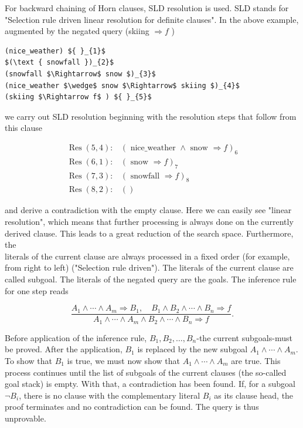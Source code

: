 \documentclass[10pt]{article}
\begin{document}
For backward chaining of Horn clauses, SLD resolution is used. SLD stands for "Selection rule driven linear resolution for definite clauses". In the above example, augmented by the negated query (skiing $\Rightarrow f$ )

\begin{verbatim}
(nice_weather) ${ }_{1}$
$(\text { snowfall })_{2}$
(snowfall $\Rightarrow$ snow $)_{3}$
(nice_weather $\wedge$ snow $\Rightarrow$ skiing $)_{4}$
(skiing $\Rightarrow f$ ) ${ }_{5}$
\end{verbatim}

we carry out SLD resolution beginning with the resolution steps that follow from this clause

$$
\begin{array}{ll}
\operatorname{Res}(5,4): & (\text { nice_weather } \wedge \text { snow } \Rightarrow f)_{6} \\
\operatorname{Res}(6,1): & (\text { snow } \Rightarrow f)_{7} \\
\operatorname{Res}(7,3): & (\text { snowfall } \Rightarrow f)_{8} \\
\operatorname{Res}(8,2): & ()
\end{array}
$$

and derive a contradiction with the empty clause. Here we can easily see "linear resolution", which means that further processing is always done on the currently derived clause. This leads to a great reduction of the search space. Furthermore, the\\
literals of the current clause are always processed in a fixed order (for example, from right to left) ("Selection rule driven"). The literals of the current clause are called subgoal. The literals of the negated query are the goals. The inference rule for one step reads


$$
\frac{A_{1} \wedge \cdots \wedge A_{m} \Rightarrow B_{1}, \quad B_{1} \wedge B_{2} \wedge \cdots \wedge B_{n} \Rightarrow f}{A_{1} \wedge \cdots \wedge A_{m} \wedge B_{2} \wedge \cdots \wedge B_{n} \Rightarrow f} .
$$

Before application of the inference rule, $B_{1}, B_{2}, \ldots, B_{n}$-the current subgoals-must be proved. After the application, $B_{1}$ is replaced by the new subgoal $A_{1} \wedge \cdots \wedge A_{m}$. To show that $B_{1}$ is true, we must now show that $A_{1} \wedge \cdots \wedge A_{m}$ are true. This process continues until the list of subgoals of the current clauses (the so-called goal stack) is empty. With that, a contradiction has been found. If, for a subgoal $\neg B_{i}$, there is no clause with the complementary literal $B_{i}$ as its clause head, the proof terminates and no contradiction can be found. The query is thus unprovable.
\end{document}
